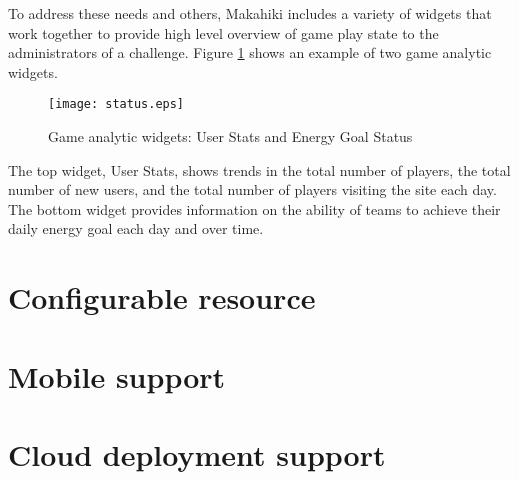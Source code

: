 To address these needs and others, Makahiki includes a variety of widgets that work together to provide high level overview of game play state to the administrators of a challenge. Figure \ref{fig:status} shows an example of two game analytic widgets.

\begin{figure}[t!]
  \center
  \texttt{[image: status.eps]}
  \caption{Game analytic widgets: User Stats and Energy Goal Status}
  \label{fig:status}
\end{figure}

The top widget, User Stats, shows trends in the total number of players, the total number of new users, and the total number of players visiting the site each day.  The bottom widget provides information on the ability of teams to achieve their daily energy goal each day and over time.

\section{Configurable resource}

\section{Mobile support}

\section{Cloud deployment support}
